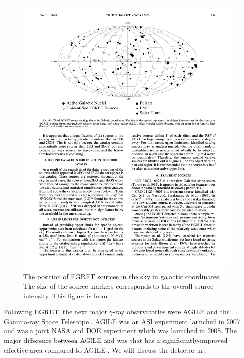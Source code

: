 \begin{figure}[htbp]
\centering
\includegraphics{chapters/introduction/figures/third_egret_catalog_sources.pdf}
\caption{The position of \ac{EGRET} sources in the sky in galactic
coordinates.  The size of the source markers corresponds to the overall
source intensity.  This figure is from \citep{hartman_1999a_third-egret}.}
\end{figure}

Following \ac{EGRET}, the next major $\gamma$-ray observatories
were \ac{AGILE} \citep{pittori_2003a_gamma-ray-imaging}
and the \fermi Gamma-ray Space Telescope \citep{atwood_2009a_large-telescope}.  \ac{AGILE}
was an \ac{ASI} experiment launched in 2007 and \fermi was
a joint \ac{NASA} and \ac{DOE} experiment which was launched
in 2008.  The major difference between \ac{AGILE} and \fermi
was that \fermi has a significantly-improved effective area
\citep[$9,500\unitspace\cm^2$,][]{atwood_2009a_large-telescope}
compared to \ac{AGILE}
\citep[$\sim500\unitspace\cm^2$,][]{pittori_2003a_gamma-ray-imaging}.
We will discuss the \fermi detector in .
